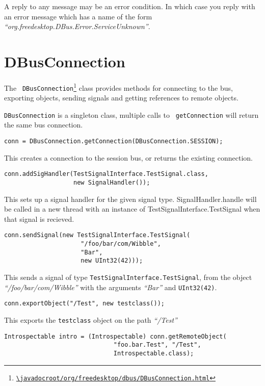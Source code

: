 \documentclass[a4paper,12pt]{article}
\begin{document}
A reply to any message may be an error condition. In which case you reply with
an error message which has a name of the form {\em
   ``org.freedesktop.DBus.Error.ServiceUnknown''}. 

\section{DBusConnection}

The {\tt
DBusConnection\footnote{\url{\javadocroot/org/freedesktop/dbus/DBusConnection.html}}}
class provides methods for connecting to the bus, exporting objects,
sending signals and getting references to remote objects.

{\tt DBusConnection} is a singleton class, multiple calls to {\tt
getConnection} will return the same bus connection. 

\begin{verbatim}
conn = DBusConnection.getConnection(DBusConnection.SESSION);
\end{verbatim}

This creates a connection to the session bus, or returns the
existing connection.

\begin{verbatim}
conn.addSigHandler(TestSignalInterface.TestSignal.class,
                   new SignalHandler());
\end{verbatim}

This sets up a signal handler for the given signal type.
SignalHandler.handle will be called in a new thread with an instance
of TestSignalInterface.TestSignal when that signal is recieved.

\begin{verbatim}
conn.sendSignal(new TestSignalInterface.TestSignal(
                     "/foo/bar/com/Wibble", 
                     "Bar", 
                     new UInt32(42)));
\end{verbatim}

This sends a signal of type {\tt TestSignalInterface.TestSignal},
from the object {\em ``/foo/bar/com/Wibble''} with the arguments {\em
``Bar''} and {\tt UInt32(42)}.

\begin{verbatim}
conn.exportObject("/Test", new testclass());
\end{verbatim}

This exports the {\tt testclass} object on the path {\em ``/Test''}

\begin{verbatim}
Introspectable intro = (Introspectable) conn.getRemoteObject(
                              "foo.bar.Test", "/Test",
                              Introspectable.class);
\end{verbatim}
\end{document}
